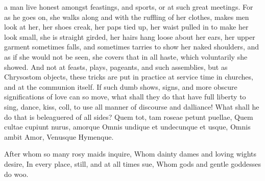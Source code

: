 {a man live honest amongst feastings, and sports, or at such great
meetings. For as he goes on, she walks along and with the
ruffling of her clothes, makes men look at her, her shoes creak, her
paps tied up, her waist pulled in to make her look small, she is
straight girded, her hairs hang loose about her ears, her upper garment
sometimes falls, and sometimes tarries to show her naked shoulders, and
as if she would not be seen, she covers that in all haste, which
voluntarily she showed. And not at feasts, plays, pageants, and such
assemblies, but as Chrysostom objects, these tricks are put in
practice at service time in churches, and at the communion itself. If
such dumb shows, signs, and more obscure significations of love can so
move, what shall they do that have full liberty to sing, dance, kiss,
coll, to use all manner of discourse and dalliance! What shall he do
that is beleaguered of all sides?
Quem tot, tam roseae petunt puellae,
Quem cultae cupiunt nurus, amorque
Omnis undique et undecunque et usque,
Omnis ambit Amor, Venusque Hymenque.

After whom so many rosy maids inquire,
Whom dainty dames and loving wights desire,
In every place, still, and at all times sue,
Whom gods and gentle goddesses do woo.

}
